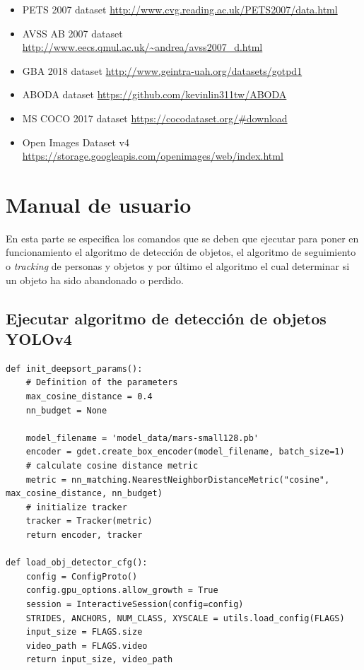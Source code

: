 \begin{itemize}
    \item PETS 2007 dataset \url{http://www.cvg.reading.ac.uk/PETS2007/data.html} \cite{pets2007-dataset}
    \item AVSS AB 2007 dataset \url{http://www.eecs.qmul.ac.uk/~andrea/avss2007_d.html} \cite{AVSSAB2007-dataset}
    \item GBA 2018 dataset \url{http://www.geintra-uah.org/datasets/gotpd1} \cite{gba-dataset}
    \item ABODA dataset \url{https://github.com/kevinlin311tw/ABODA} \cite{aboda-dataset}
    \item MS COCO 2017 dataset \url{https://cocodataset.org/#download} \cite{lin2015microsoft}
    \item Open Images Dataset v4 \url{https://storage.googleapis.com/openimages/web/index.html} \cite{Kuznetsova_2020}
    
    
    
    
\end{itemize}

\section{Manual de usuario}
\label{sec:manual-usuario}

En esta parte se especifica los comandos que se deben que ejecutar para poner en funcionamiento el algoritmo de detección de objetos, el algoritmo de seguimiento o \textit{tracking} de personas y objetos y por último el algoritmo el cual determinar si un objeto ha sido abandonado o perdido.

\subsection{Ejecutar algoritmo de detección de objetos YOLOv4}

\vspace{0.5cm}
\begin{lstlisting}[language=iPython,caption=Funciones de object tracking ,captionpos=b,label={lst:object-tracking}]
def init_deepsort_params():
    # Definition of the parameters
    max_cosine_distance = 0.4
    nn_budget = None

    model_filename = 'model_data/mars-small128.pb'
    encoder = gdet.create_box_encoder(model_filename, batch_size=1)
    # calculate cosine distance metric
    metric = nn_matching.NearestNeighborDistanceMetric("cosine", max_cosine_distance, nn_budget)
    # initialize tracker
    tracker = Tracker(metric)
    return encoder, tracker
    
def load_obj_detector_cfg():
    config = ConfigProto()
    config.gpu_options.allow_growth = True
    session = InteractiveSession(config=config)
    STRIDES, ANCHORS, NUM_CLASS, XYSCALE = utils.load_config(FLAGS)
    input_size = FLAGS.size
    video_path = FLAGS.video
    return input_size, video_path

\end{lstlisting}

